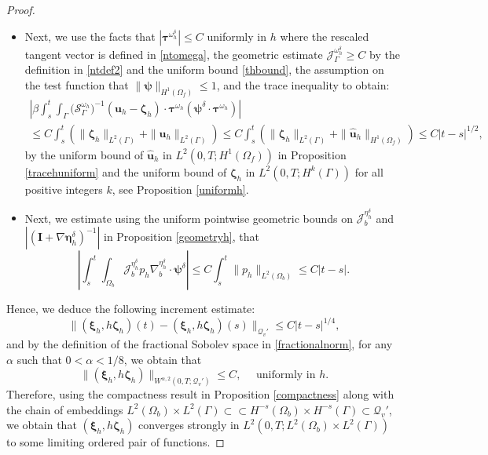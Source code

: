 \documentclass[11pt]{article}
\newcommand{\bd}{\boldsymbol}
\theoremstyle{definition}
\begin{document}
\begin{proof}
\begin{itemize}
\item Next, we use the facts that $|\bd{\tau}^{\omega^{\delta}_{h}}| \le C$ uniformly in $h$ where the rescaled tangent vector is defined in \eqref{ntomega}, the geometric estimate $\mathcal{J}^{\omega^{\delta}_{h}}_{\Gamma} \ge C$ by the definition in \eqref{ntdef2} and the uniform bound \eqref{thbound}, the assumption on the test function that $\|\bd{\psi}\|_{H^{1}(\Omega_{f})} \le 1$, and the trace inequality to obtain:
\begin{multline*}
\left|\beta \int_{s}^{t} \int_{\Gamma} \Big(\mathcal{S}^{\omega_{h}}_{\Gamma}\Big)^{-1} (\bd{u}_{h} - \bd{\zeta}_{h}) \cdot \bd{\tau}^{\omega_{h}} \left(\bd{\psi}^{\delta} \cdot \bd{\tau}^{\omega_{h}}\right)\right| \\
\le C\int_{s}^{t} \left(\|\bd{\zeta}_{h}\|_{L^{2}(\Gamma)} + \|\bd{u}_{h}\|_{L^{2}(\Gamma)}\right) \le C\int_{s}^{t} \left(\|\bd{\zeta}_{h}\|_{L^{2}(\Gamma)} + \|\hat{\bd{u}}_{h}\|_{H^{1}(\Omega_{f})}\right) \le C|t - s|^{1/2},
\end{multline*}
by the uniform bound of $\hat{\bd{u}}_{h}$ in $L^{2}(0, T; H^{1}(\Omega_{f}))$ in Proposition \ref{tracehuniform} and the uniform bound of $\bd{\zeta}_{h}$ in $L^{2}(0, T; H^{k}(\Gamma))$ for all positive integers $k$, see Proposition \ref{uniformh}. 
\item Next, we estimate using the uniform pointwise geometric bounds on $\mathcal{J}^{\eta^{\delta}_{h}}_{b}$ and $|(\bd{I} + \nabla \bd{\eta}^{\delta}_{h})^{-1}|$ in Proposition \ref{geometryh}, that
\begin{equation*}
\left|\int_{s}^{t} \int_{\Omega_{b}} \mathcal{J}^{\eta^{\delta}_{h}}_{b} p_{h} \nabla^{\eta^{\delta}_{h}}_{b} \cdot \bd{\psi}^{\delta}\right| \le C \int_{s}^{t} \|p_{h}\|_{L^{2}(\Omega_{b})} \le C|t - s|.
\end{equation*}
\end{itemize}
Hence, we deduce the following increment estimate:
\begin{equation*}
\|(\bd{\xi}_{h}, h\bd{\zeta}_{h})(t) - (\bd{\xi}_{h}, h\bd{\zeta}_{h})(s)\|_{\mathcal{Q}_{v}'} \le C|t - s|^{1/4},
\end{equation*}
and by the definition of the fractional Sobolev space in \eqref{fractionalnorm}, for any $\alpha$ such that $0 < \alpha < 1/8$, we obtain that
\begin{equation*}
\|(\bd{\xi}_{h}, h\bd{\zeta}_{h})\|_{W^{\alpha, 2}(0, T; \mathcal{Q}_{v}')} \le C, \quad \text{ uniformly in $h$}.
\end{equation*}
Therefore, using the compactness result in Proposition \ref{compactness} along with the chain of embeddings $L^{2}(\Omega_{b}) \times L^{2}(\Gamma) \subset \subset H^{-s}(\Omega_{b}) \times H^{-s}(\Gamma) \subset \mathcal{Q}_{v}'$, we obtain that $(\bd{\xi}_{h}, h\bd{\zeta}_{h})$ converges strongly in $L^{2}(0, T; L^{2}(\Omega_{b}) \times L^{2}(\Gamma))$ to some limiting ordered pair of functions.


\end{proof}
\end{document}
